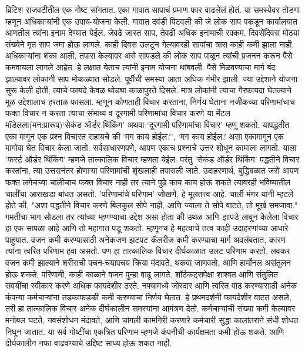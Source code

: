 ब्रिटिश राजवटीतील एक गोष्ट सांगतात. एका गावात सापाचं प्रमाण फार वाढलेलं होतं. या समस्येवर तोडगा म्हणून अधिकाऱ्यांनी एक उपाय-योजना केली. गावात दवंडी पिटवली की जे लोक साप पकडून कार्यालयात आणतील त्यांना इनाम देण्यात येईल. जेवढे जास्त साप, तेवढी अधिक इनामाची रक्कम. दिवसेंदिवस मोठ्या संख्येने मृत साप जमा होऊ लागले. काही दिवस उलटून गेल्यावरही सापांचा त्रास काही कमी झाला नाही. अधिकाऱ्यांना शंका आली. तपास केल्यावर असे सापडले की लोक साप पाळून त्यांची प्रजनन करून पैसे कमवायला लागले आहेत. हे लक्षात येताच त्यांनी इनाम योजना थांबवली. पैसे मिळवण्याचा मार्ग बंद झाल्यावर लोकांनी साप मोकळ्यात सोडले. पूर्वीची समस्या आता अधिक गंभीर झाली. ज्या उद्देशाने योजना सुरू केली होती, त्याचे फायदे केवळ थोड्या काळापुरते दिसले. मात्र लोकांनी त्याचा गैरफायदा घेतल्याने मूळ उद्देशालाच हरताळ फासला.
 म्हणून कोणताही विचार करताना, निर्णय घेताना नजीकच्या परिणामांचाच फक्त विचार न करता त्याचा संभाव्य व दूरगामी परिणामांचा विचार करणे या मेंटल मॉडेलला(मन:प्रारूप)‘सेकंड ऑर्डर थिंकिंग’  अथवा ‘दूरगामी परिणामांचा विचार’ म्हणू शकतो.  यापद्धतीत एका मागून एक प्रश्न विचारत राहायचे की ‘मग काय होईल?’, ‘मग काय होईल? असा एकामागून एक मागोवा घेत विचार केला जातो. सर्वसाधारणपणे, आपण एकाच प्रश्नाचे उत्तर शोधून कामाला लागतो. याला 'फर्स्ट ऑर्डर थिंकिंग' म्हणजे तात्कालिक विचार म्हणता येईल. परंतु 'सेकंड ऑर्डर थिंकिंग' पद्धतीने विचार करतांना, त्या उत्तरानंतर होणाऱ्या परिणामांची शृंखलाही तपासली जाते.
उदाहरणार्थ, बुद्धिबळात जसे आपण फक्त लगेचच्या चालीचाच फक्त विचार नाही तर त्याने पुढे काय काय होऊ शकते त्यावरही भविष्यातील चालींचा आराखडा बांधत असतो. 'परिणामांचे परिणाम' जोखणे, हे मूलतत्त्व आहे. चार्ली मंगर यांनी म्हटले होते की, "अशा पद्धतीने विचार करणे बिलकुल सोपे नाही, आणि ज्याला ते सोपे वाटते, तो मूर्ख समजावा." गमतीचा भाग सोडला तर त्यांच्या म्हणण्याचा उद्देश असा होता की उथळ आणि झापडे लावून केलेला विचार हा एक सापळा आहे आणि तो महागात पडू शकतो. म्हणूनच हे महत्वाचे तत्व काही उदाहरणांच्या आधारे पाहुयात. 
वजन कमी करण्यासाठी अनेकजण झटपट कॅलरीज कमी करण्याचा मार्ग अवलंबतात, कारण त्यांना त्वरित परिणाम हवा असतो. पण हा तात्कालिक विचार दीर्घकाळात उलट परिणाम करतो. लवकर वजन कमी झाल्याने शरीराची पचन-चयापचय क्रिया मंदावते, थकवा जाणवतो, आणि हार्मोनल असंतुलन होऊ शकते. परिणामी, काही काळाने वजन पुन्हा वाढू लागते. शॉर्टकट्सपेक्षा शाश्वत आणि संतुलित सवयींचा स्वीकार करणे अधिक फायदेशीर ठरते.
नफ्यामध्ये जोरदार आणि त्वरित वाढ करण्यासाठी अनेक कंपन्या कर्मचार्‍यांना तडकाफडकी कमी करण्याचा निर्णय घेतात. हे प्रथमदर्शनी फायदेशीर वाटत असले, तरी हा तात्कालिक विचार अनेक दीर्घकालीन समस्यांना आमंत्रण देतो. कर्मचार्‍यांची संख्या कमी केल्यावर मनोबल घटते, नवसंशोधन मंदावते, आणि चांगली कामगिरी करणारे कर्मचारी सुद्धा कालांतराने संधी शोधत निघून जातात. या सर्व गोष्टींचा एकत्रित परिणाम म्हणजे कंपनीची कार्यक्षमता कमी होऊ शकते, आणि दीर्घकालीन नफा वाढवण्याचे उद्दिष्ट साध्य होऊ शकत नाही.
